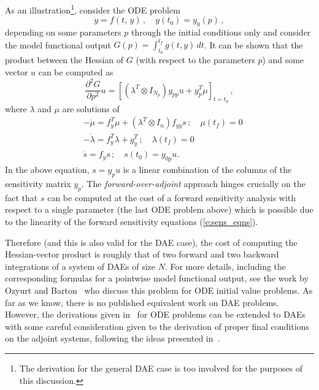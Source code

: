 As an illustration\footnote{The derivation for the general DAE case is too
involved for the purposes of this discussion.}, consider the ODE problem
\begin{equation*}
{\dot y}  = f(t,\,y) \, , \quad y(t_0)  = y_0(p) \, ,
\end{equation*}
depending on some parameters $p$ through the initial conditions only and
consider the model functional output $G(p) = \int_{t_0}^{t_f} g(t,y) \, dt$.
It can be shown that the product between the Hessian of $G$ (with respect to the
parameters $p$) and some vector $u$ can be computed as
\begin{equation*}
  \frac{\partial^2 G}{\partial p^2} u =
  \left[ \left(\lambda^T \otimes I_{N_p} \right) y_{pp}u + y_p^T \mu \right]_{t=t_0} \, ,
\end{equation*}
where $\lambda$ and $\mu$ are solutions of
\begin{equation}
  \begin{split}
    &-\dot\mu = f_y^T\mu + \left(\lambda^T \otimes I_n \right) f_{yy} s \, ; \quad \mu(t_f) = 0 \\
    &-\dot\lambda = f_y^T\lambda + g_y^T \, ; \quad \lambda(t_f) = 0 \\
    &\dot s = f_y s \, ; \quad s(t_0) = y_{0p} u .
  \end{split}
\end{equation}
In the above equation, $s = y_p u$ is a linear combination of the columns of the
sensitivity matrix $y_p$. The {\em forward-over-adjoint}
approach hinges crucially on the fact that $s$ can be computed at the cost of
a forward sensitivity analysis with respect to a single parameter (the last
ODE problem above) which is possible due to the linearity of the forward
sensitivity equations (\ref{e:sens_eqns}).

Therefore (and this is also valid for the DAE case), the cost of computing the
Hessian-vector product is roughly that of two forward and two backward integrations
of a system of DAEs of size $N$.
For more details, including the corresponding formulas for a pointwise model
functional output, see the work by Ozyurt and Barton~\cite{OzBa:05} who discuss
this problem for ODE initial value problems. As far as we know, there is no
published equivalent work on DAE problems. However, the derivations given
in~\cite{OzBa:05} for ODE problems can be extended to DAEs with some careful
consideration given to the derivation of proper final conditions on the
adjoint systems, following the ideas presented in~\cite{CLPS:03}.

